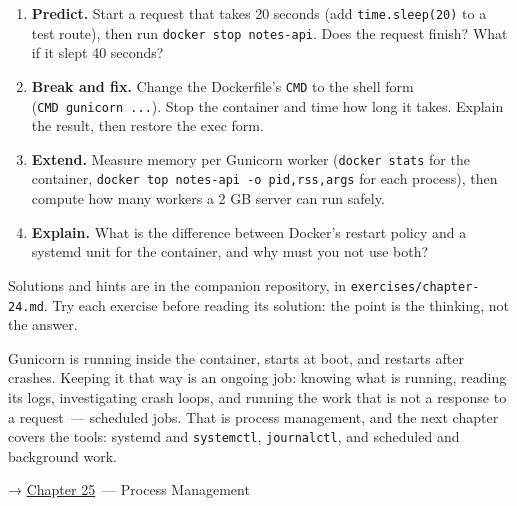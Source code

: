 \begin{enumerate}
\def\labelenumi{\arabic{enumi}.}
\tightlist
\item
  \textbf{Predict.} Start a request that takes 20 seconds (add \texttt{time.sleep(20)} to a test route), then run \texttt{docker\ stop\ notes-api}. Does the request finish? What if it slept 40 seconds?
\item
  \textbf{Break and fix.} Change the Dockerfile's \texttt{CMD} to the shell form (\texttt{CMD\ gunicorn\ ...}). Stop the container and time how long it takes. Explain the result, then restore the exec form.
\item
  \textbf{Extend.} Measure memory per Gunicorn worker (\texttt{docker\ stats} for the container, \texttt{docker\ top\ notes-}\allowbreak{}\texttt{api\ -}\allowbreak{}\texttt{o\ pid,}\allowbreak{}\texttt{rss,}\allowbreak{}\texttt{args} for each process), then compute how many workers a 2 GB server can run safely.
\item
  \textbf{Explain.} What is the difference between Docker's restart policy and a systemd unit for the container, and why must you not use both?
\end{enumerate}

\noindent{}Solutions and hints are in the companion repository, in \texttt{exercises/}\allowbreak{}\texttt{chapter-24.md}. Try each exercise before reading its solution: the point is the thinking, not the answer.

\label{24-process-startup:whats-next}

Gunicorn is running inside the container, starts at boot, and restarts after crashes. Keeping it that way is an ongoing job: knowing what is running, reading its logs, investigating crash loops, and running the work that is not a response to a request~--- scheduled jobs. That is process management, and the next chapter covers the tools: systemd and \texttt{systemctl}, \texttt{journalctl}, and scheduled and background work.

\noindent{}→ \hyperref[ch:25-process-management]{Chapter 25}~--- Process Management
